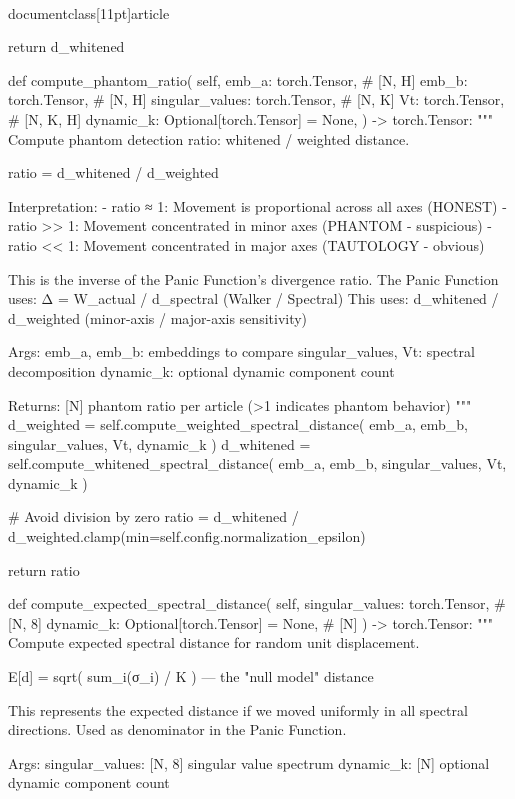 \\documentclass[11pt]{article}
\begin{document}
\begin{CodeBlock}
        return d_whitened

    def compute_phantom_ratio(
        self,
        emb_a: torch.Tensor,  # [N, H]
        emb_b: torch.Tensor,  # [N, H]
        singular_values: torch.Tensor,  # [N, K]
        Vt: torch.Tensor,  # [N, K, H]
        dynamic_k: Optional[torch.Tensor] = None,
    ) -> torch.Tensor:
        """
        Compute phantom detection ratio: whitened / weighted distance.

        ratio = d_whitened / d_weighted

        Interpretation:
        - ratio ≈ 1: Movement is proportional across all axes (HONEST)
        - ratio >> 1: Movement concentrated in minor axes (PHANTOM - suspicious)
        - ratio << 1: Movement concentrated in major axes (TAUTOLOGY - obvious)

        This is the inverse of the Panic Function's divergence ratio.
        The Panic Function uses: Δ = W_actual / d_spectral (Walker / Spectral)
        This uses: d_whitened / d_weighted (minor-axis / major-axis sensitivity)

        Args:
            emb_a, emb_b: embeddings to compare
            singular_values, Vt: spectral decomposition
            dynamic_k: optional dynamic component count

        Returns:
            [N] phantom ratio per article (>1 indicates phantom behavior)
        """
        d_weighted = self.compute_weighted_spectral_distance(
            emb_a, emb_b, singular_values, Vt, dynamic_k
        )
        d_whitened = self.compute_whitened_spectral_distance(
            emb_a, emb_b, singular_values, Vt, dynamic_k
        )

        # Avoid division by zero
        ratio = d_whitened / d_weighted.clamp(min=self.config.normalization_epsilon)

        return ratio

    def compute_expected_spectral_distance(
        self,
        singular_values: torch.Tensor,  # [N, 8]
        dynamic_k: Optional[torch.Tensor] = None,  # [N]
    ) -> torch.Tensor:
        """
        Compute expected spectral distance for random unit displacement.

        E[d] = sqrt( sum_i(σ_i) / K ) — the "null model" distance

        This represents the expected distance if we moved uniformly in all
        spectral directions. Used as denominator in the Panic Function.

        Args:
            singular_values: [N, 8] singular value spectrum
            dynamic_k: [N] optional dynamic component count


\end{CodeBlock}
\end{document}
